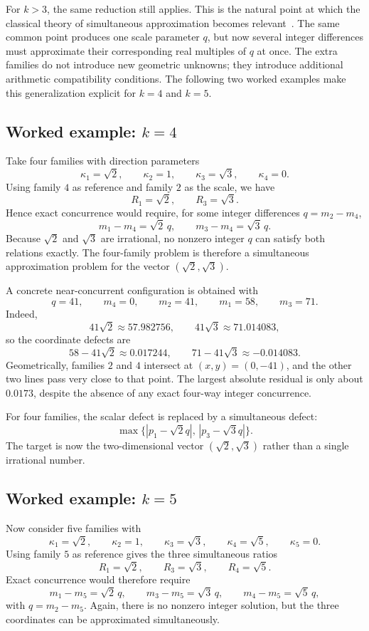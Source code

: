\documentclass[11pt,a4paper]{article}
\begin{document}
For $k>3$, the same reduction still applies. This is the natural point at which the classical theory of simultaneous approximation becomes relevant~\cite{schmidt1980,waldschmidt2009}. The same common point
produces one scale parameter $q$, but now several integer differences must approximate their
corresponding real multiples of $q$ at once. The extra families do not introduce new geometric
unknowns; they introduce additional arithmetic compatibility conditions. The following two worked
examples make this generalization explicit for $k=4$ and $k=5$.

\subsection{Worked example: $k=4$}
Take four families with direction parameters
\[
\kappa_1=\sqrt2,
\qquad
\kappa_2=1,
\qquad
\kappa_3=\sqrt3,
\qquad
\kappa_4=0.
\]
Using family $4$ as reference and family $2$ as the scale, we have
\[
R_1=\sqrt2,
\qquad
R_3=\sqrt3.
\]
Hence exact concurrence would require, for some integer differences
$q=m_2-m_4$,
\[
m_1-m_4=\sqrt2\,q,
\qquad
m_3-m_4=\sqrt3\,q.
\]
Because $\sqrt2$ and $\sqrt3$ are irrational, no nonzero integer $q$ can satisfy both
relations exactly. The four-family problem is therefore a simultaneous approximation problem for
the vector $(\sqrt2,\sqrt3)$.

A concrete near-concurrent configuration is obtained with
\[
q=41,
\qquad
m_4=0,
\qquad
m_2=41,
\qquad
m_1=58,
\qquad
m_3=71.
\]
Indeed,
\[
41\sqrt2\approx57.982756,
\qquad
41\sqrt3\approx71.014083,
\]
so the coordinate defects are
\[
58-41\sqrt2\approx0.017244,
\qquad
71-41\sqrt3\approx-0.014083.
\]
Geometrically, families $2$ and $4$ intersect at $(x,y)=(0,-41)$, and the other two lines pass
very close to that point. The largest absolute residual is only about $0.0173$, despite the
absence of any exact four-way integer concurrence.

For four families, the scalar defect is replaced by a simultaneous defect:
\[
\max\bigl\{|p_1-\sqrt2 q|,\,|p_3-\sqrt3 q|\bigr\}.
\]
The target is now the two-dimensional vector $(\sqrt2,\sqrt3)$ rather than a single irrational number.

\subsection{Worked example: $k=5$}
Now consider five families with
\[
\kappa_1=\sqrt2,
\qquad
\kappa_2=1,
\qquad
\kappa_3=\sqrt3,
\qquad
\kappa_4=\sqrt5,
\qquad
\kappa_5=0.
\]
Using family $5$ as reference gives the three simultaneous ratios
\[
R_1=\sqrt2,
\qquad
R_3=\sqrt3,
\qquad
R_4=\sqrt5.
\]
Exact concurrence would therefore require
\[
m_1-m_5=\sqrt2\,q,
\qquad
m_3-m_5=\sqrt3\,q,
\qquad
m_4-m_5=\sqrt5\,q,
\]
with $q=m_2-m_5$. Again, there is no nonzero integer solution, but the three coordinates can be
approximated simultaneously.
\end{document}
